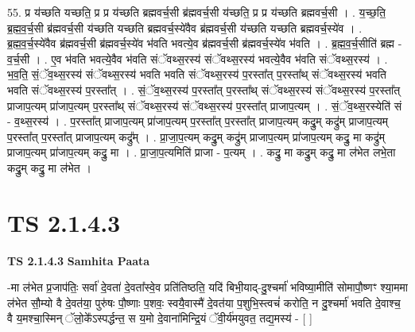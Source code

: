 \documentclass[17pt]{extarticle}
\begin{document}
55. प्र य॑च्छति यच्छति॒ प्र प्र य॑च्छति ब्रह्मवर्च॒सी ब्र॑ह्मवर्च॒सी य॑च्छति॒ प्र प्र य॑च्छति ब्रह्मवर्च॒सी । . य॒च्छ॒ति॒ ब्र॒ह्म॒व॒र्च॒सी ब्र॑ह्मवर्च॒सी य॑च्छति यच्छति ब्रह्मवर्च॒स्ये॑वैव ब्र॑ह्मवर्च॒सी य॑च्छति यच्छति ब्रह्मवर्च॒स्ये॑व । . ब्र॒ह्म॒व॒र्च॒स्ये॑वैव ब्र॑ह्मवर्च॒सी ब्र॑ह्मवर्च॒स्ये॑व भ॑वति भवत्ये॒व ब्र॑ह्मवर्च॒सी ब्र॑ह्मवर्च॒स्ये॑व भ॑वति । . ब्र॒ह्म॒व॒र्च॒सीति॑ ब्रह्म - व॒र्च॒सी । . ए॒व भ॑वति भवत्ये॒वैव भ॑वति संॅवथ्स॒रस्य॑ संॅवथ्स॒रस्य॑ भवत्ये॒वैव भ॑वति संॅवथ्स॒रस्य॑ । . भ॒व॒ति॒ सं॒ॅव॒थ्स॒रस्य॑ संॅवथ्स॒रस्य॑ भवति भवति संॅवथ्स॒रस्य॑ प॒रस्ता᳚त् प॒रस्ता᳚थ् संॅवथ्स॒रस्य॑ भवति भवति संॅवथ्स॒रस्य॑ प॒रस्ता᳚त् । . सं॒ॅव॒थ्स॒रस्य॑ प॒रस्ता᳚त् प॒रस्ता᳚थ् संॅवथ्स॒रस्य॑ संॅवथ्स॒रस्य॑ प॒रस्ता᳚त् प्राजाप॒त्यम् प्रा॑जाप॒त्यम् प॒रस्ता᳚थ् संॅवथ्स॒रस्य॑ संॅवथ्स॒रस्य॑ प॒रस्ता᳚त् प्राजाप॒त्यम् । . सं॒ॅव॒थ्स॒रस्येति॑ सं - व॒थ्स॒रस्य॑ । . प॒रस्ता᳚त् प्राजाप॒त्यम् प्रा॑जाप॒त्यम् प॒रस्ता᳚त् प॒रस्ता᳚त् प्राजाप॒त्यम् कद्रु॒म् कद्रु॑म् प्राजाप॒त्यम् प॒रस्ता᳚त् प॒रस्ता᳚त् प्राजाप॒त्यम् कद्रु᳚म् । . प्रा॒जा॒प॒त्यम् कद्रु॒म् कद्रु॑म् प्राजाप॒त्यम् प्रा॑जाप॒त्यम् कद्रु॒ मा कद्रु॑म् प्राजाप॒त्यम् प्रा॑जाप॒त्यम् कद्रु॒ मा । . प्रा॒जा॒प॒त्यमिति॑ प्राजा - प॒त्यम् । . कद्रु॒ मा कद्रु॒म् कद्रु॒ मा ल॑भेत लभे॒ता कद्रु॒म् कद्रु॒ मा ल॑भेत । \newline
\pagebreak
{}

\section{ TS 2.1.4.3 }

\textbf{TS 2.1.4.3 } \newline
\textbf{Samhita Paata} \newline

-मा ल॑भेत प्र॒जाप॑तिः॒ सर्वा॑ दे॒वता॑ दे॒वता᳚स्वे॒व प्रति॑तिष्ठति॒ यदि॑ बिभी॒याद्-दु॒श्चर्मा॑ भविष्या॒मीति॑ सोमापौ॒ष्णꣳ श्या॒ममा ल॑भेत सौ॒म्यो वै दे॒वत॑या॒ पुरु॑षः पौ॒ष्णाः प॒शवः॒ स्वयै॒वास्मै॑ दे॒वत॑या प॒शुभि॒स्त्वचं॑ करोति॒ न दु॒श्चर्मा॑ भवति दे॒वाश्च॒ वै य॒मश्चा॒स्मिन् ॅलो॒के᳚ऽस्पर्द्धन्त॒ स य॒मो दे॒वाना॑मिन्द्रि॒यं ॅवी॒र्य॑मयुवत॒ तद्य॒मस्य॑ - [  ] \newline
\end{document}
